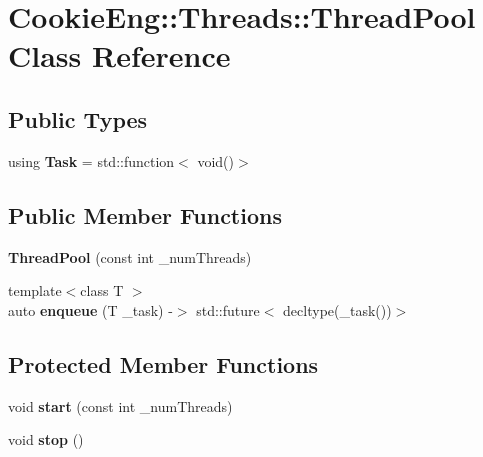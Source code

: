 \hypertarget{class_cookie_eng_1_1_threads_1_1_thread_pool}{}\section{Cookie\+Eng\+:\+:Threads\+:\+:Thread\+Pool Class Reference}
\label{class_cookie_eng_1_1_threads_1_1_thread_pool}
\subsection*{Public Types}
\begin{DoxyCompactItemize}
\item 
\mbox{\label{class_cookie_eng_1_1_threads_1_1_thread_pool_a3ec0c6482d6e8acd4bb3f49a976afbd4}} 
using {\bfseries Task} = std\+::function$<$ void()$>$
\end{DoxyCompactItemize}
\subsection*{Public Member Functions}
\begin{DoxyCompactItemize}
\item 
\mbox{\label{class_cookie_eng_1_1_threads_1_1_thread_pool_a45d9e0c04c6ed38e994219591b62e775}} 
{\bfseries Thread\+Pool} (const int \+\_\+num\+Threads)
\item 
\mbox{\label{class_cookie_eng_1_1_threads_1_1_thread_pool_aa89bc838d587ed5c949a7b87a4f78c67}} 
{\footnotesize template$<$class T $>$ }\\auto {\bfseries enqueue} (T \+\_\+task) -\/$>$ std\+::future$<$ decltype(\+\_\+task())$>$
\end{DoxyCompactItemize}
\subsection*{Protected Member Functions}
\begin{DoxyCompactItemize}
\item 
\mbox{\label{class_cookie_eng_1_1_threads_1_1_thread_pool_aa1ec49665f4cef513dc11efd7bbf3ac6}} 
void {\bfseries start} (const int \+\_\+num\+Threads)
\item 
\mbox{\label{class_cookie_eng_1_1_threads_1_1_thread_pool_a2260d3d26f58843f9b87997aec916649}} 
void {\bfseries stop} ()
\end{DoxyCompactItemize}

